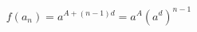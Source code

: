 \documentclass[preview]{standalone}
\begin{document}
\begin{align*}
f(a_n) = a^{A + (n-1)d} = a^A (a^d)^{n-1}
\end{align*}
\end{document}
